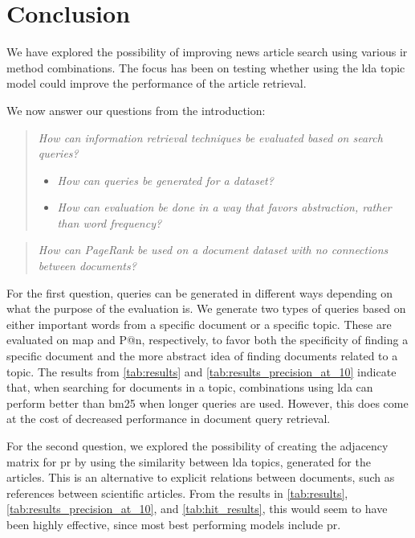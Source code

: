 \section{Conclusion}\label{sec:conclusion}
We have explored the possibility of improving news article search using various \gls{ir} method combinations.
The focus has been on testing whether using the \gls{lda} topic model could improve the performance of the article retrieval.

We now answer our questions from the introduction:
\begin{quote}
	\emph{How can information retrieval techniques be evaluated based on search queries?}
	\begin{itemize}
		\item \emph{How can queries be generated for a dataset?}
		\item \emph{How can evaluation be done in a way that favors abstraction, rather than word frequency?}
	\end{itemize}
\end{quote}
\vspace{0.1 cm}

\begin{quote}
	\emph{How can PageRank be used on a document dataset with no connections between documents?}
\end{quote}

For the first question, queries can be generated in different ways depending on what the purpose of the evaluation is.
We generate two types of queries based on either important words from a specific document or a specific topic.
These are evaluated on \acrlong{map} and P@n, respectively, to favor both the specificity of finding a specific document and the more abstract idea of finding documents related to a topic.
The results from \autoref{tab:results} and \autoref{tab:results_precision_at_10} indicate that, when searching for documents in a topic, combinations using \gls{lda} can perform better than \gls{bm25} when longer queries are used.
However, this does come at the cost of decreased performance in document query retrieval.

For the second question, we explored the possibility of creating the adjacency matrix for \gls{pr} by using the similarity between \gls{lda} topics, generated for the articles.
This is an alternative to explicit relations between documents, such as references between scientific articles.
From the results in \autoref{tab:results}, \autoref{tab:results_precision_at_10}, and \autoref{tab:hit_results}, this would seem to have been highly effective, since most best performing models include \gls{pr}.
